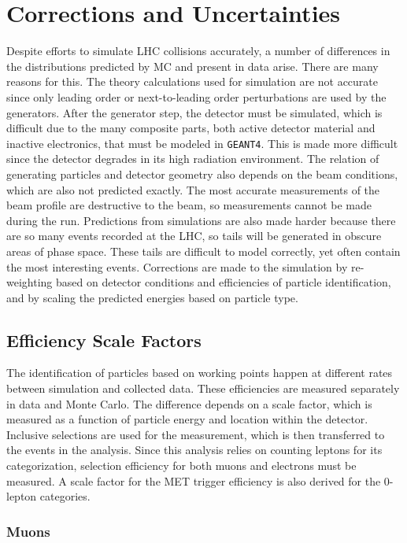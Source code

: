 \chapter{Corrections and Uncertainties}

Despite efforts to simulate LHC collisions accurately,
a number of differences in the distributions predicted by MC and present in data arise.
There are many reasons for this.
The theory calculations used for simulation are not accurate since only leading order or
next-to-leading order perturbations are used by the generators.
After the generator step, the detector must be simulated,
which is difficult due to the many composite parts,
both active detector material and inactive electronics, that must be modeled in \texttt{GEANT4}.
This is made more difficult since the detector degrades in its high radiation environment.
The relation of generating particles and detector geometry also depends on the beam conditions,
which are also not predicted exactly.
The most accurate measurements of the beam profile are destructive to the beam,
so measurements cannot be made during the run.
Predictions from simulations are also made harder because there are so many events recorded at the LHC,
so tails will be generated in obscure areas of phase space.
These tails are difficult to model correctly, yet often contain the most interesting events.
Corrections are made to the simulation by re-weighting based on detector conditions and
efficiencies of particle identification,
and by scaling the predicted energies based on particle type.

\section{Efficiency Scale Factors}

The identification of particles based on working points happen at different rates
between simulation and collected data.
These efficiencies are measured separately in data and Monte Carlo.
The difference depends on a scale factor,
which is measured as a function of particle energy and location within the detector.
Inclusive selections are used for the measurement,
which is then transferred to the events in the analysis.
Since this analysis relies on counting leptons for its categorization,
selection efficiency for both muons and electrons must be measured.
A scale factor for the MET trigger efficiency is also derived for the 0-lepton categories.

\subsection{Muons}

